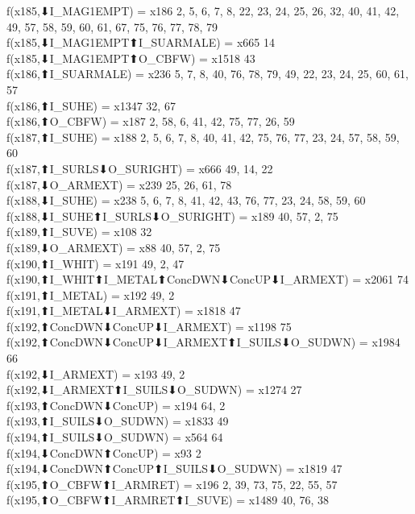 f(x185,⬇I_MAG1EMPT) = x186 {2, 5, 6, 7, 8, 22, 23, 24, 25, 26, 32, 40, 41, 42, 49, 57, 58, 59, 60, 61, 67, 75, 76, 77, 78, 79} \\
f(x185,⬇I_MAG1EMPT⬆I_SUARMALE) = x665 {14} \\
f(x185,⬇I_MAG1EMPT⬆O_CBFW) = x1518 {43} \\
f(x186,⬆I_SUARMALE) = x236 {5, 7, 8, 40, 76, 78, 79, 49, 22, 23, 24, 25, 60, 61, 57} \\
f(x186,⬆I_SUHE) = x1347 {32, 67} \\
f(x186,⬆O_CBFW) = x187 {2, 58, 6, 41, 42, 75, 77, 26, 59} \\
f(x187,⬆I_SUHE) = x188 {2, 5, 6, 7, 8, 40, 41, 42, 75, 76, 77, 23, 24, 57, 58, 59, 60} \\
f(x187,⬆I_SURLS⬇O_SURIGHT) = x666 {49, 14, 22} \\
f(x187,⬇O_ARMEXT) = x239 {25, 26, 61, 78} \\
f(x188,⬇I_SUHE) = x238 {5, 6, 7, 8, 41, 42, 43, 76, 77, 23, 24, 58, 59, 60} \\
f(x188,⬇I_SUHE⬆I_SURLS⬇O_SURIGHT) = x189 {40, 57, 2, 75} \\
f(x189,⬆I_SUVE) = x108 {32} \\
f(x189,⬇O_ARMEXT) = x88 {40, 57, 2, 75} \\
f(x190,⬆I_WHIT) = x191 {49, 2, 47} \\
f(x190,⬆I_WHIT⬆I_METAL⬆ConcDWN⬇ConcUP⬇I_ARMEXT) = x2061 {74} \\
f(x191,⬆I_METAL) = x192 {49, 2} \\
f(x191,⬆I_METAL⬇I_ARMEXT) = x1818 {47} \\
f(x192,⬆ConcDWN⬇ConcUP⬇I_ARMEXT) = x1198 {75} \\
f(x192,⬆ConcDWN⬇ConcUP⬇I_ARMEXT⬆I_SUILS⬇O_SUDWN) = x1984 {66} \\
f(x192,⬇I_ARMEXT) = x193 {49, 2} \\
f(x192,⬇I_ARMEXT⬆I_SUILS⬇O_SUDWN) = x1274 {27} \\
f(x193,⬆ConcDWN⬇ConcUP) = x194 {64, 2} \\
f(x193,⬆I_SUILS⬇O_SUDWN) = x1833 {49} \\
f(x194,⬆I_SUILS⬇O_SUDWN) = x564 {64} \\
f(x194,⬇ConcDWN⬆ConcUP) = x93 {2} \\
f(x194,⬇ConcDWN⬆ConcUP⬆I_SUILS⬇O_SUDWN) = x1819 {47} \\
f(x195,⬆O_CBFW⬆I_ARMRET) = x196 {2, 39, 73, 75, 22, 55, 57} \\
f(x195,⬆O_CBFW⬆I_ARMRET⬆I_SUVE) = x1489 {40, 76, 38} \\
